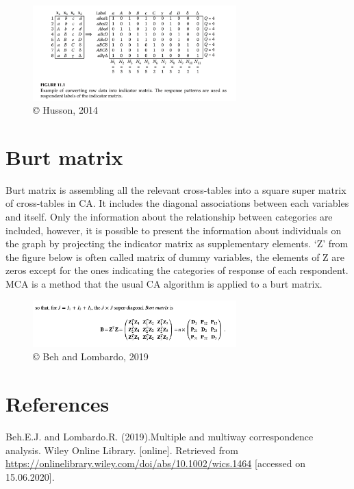 \documentclass[]{book}
\begin{document}
\begin{figure}
\centering
\includegraphics[width=0.7\textwidth,height=\textheight]{IDM.png}
\caption{© Husson, 2014}
\end{figure}

\hypertarget{burt-matrix}{%
\section{Burt matrix}\label{burt-matrix}}

Burt matrix is assembling all the relevant cross-tables into a square super matrix of cross-tables in CA. It includes the diagonal associations between each variables and itself. Only the information about the relationship between categories are included, however, it is possible to present the information about individuals on the graph by projecting the indicator matrix as supplementary elements. `Z' from the figure below is often called matrix of dummy variables, the elements of Z are zeros except for the ones indicating the categories of response of each respondent. MCA is a method that the usual CA algorithm is applied to a burt matrix.

\begin{figure}
\centering
\includegraphics[width=0.7\textwidth,height=\textheight]{burt matrix.png}
\caption{© Beh and Lombardo, 2019}
\end{figure}

\hypertarget{references-3}{%
\section{References}\label{references-3}}

Beh.E.J. and Lombardo.R. (2019).Multiple and multiway correspondence analysis. Wiley Online Library. {[}online{]}. Retrieved from \url{https://onlinelibrary.wiley.com/doi/abs/10.1002/wics.1464} {[}accessed on 15.06.2020{]}.
\end{document}

